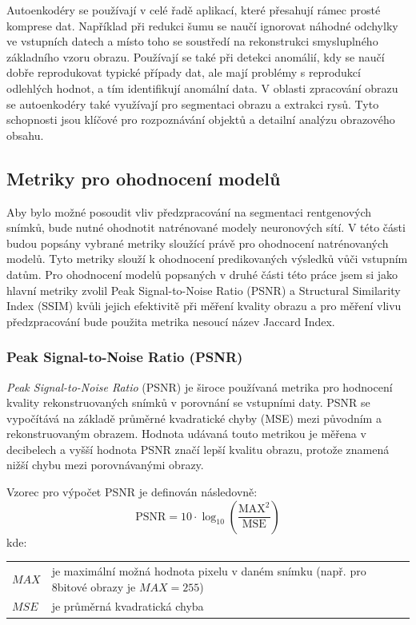 \documentclass[male,czech,api_ing]{thesis}
\makeatletter
\newenvironment{conditions}[1][kde:]
    {#1 \begin{tabular}[t]{>{$}l<{$} @{${}={}$} >{\raggedright\arraybackslash}p{10cm}}}
    {\end{tabular}}
\makeatother
\begin{document}
Autoenkodéry se používají v celé řadě aplikací, které přesahují rámec prosté komprese dat. Například při redukci šumu se naučí ignorovat náhodné odchylky ve vstupních datech a místo toho se soustředí na rekonstrukci smysluplného základního vzoru obrazu. Používají se také při detekci anomálií, kdy se naučí dobře reprodukovat typické případy dat, ale mají problémy s reprodukcí odlehlých hodnot, a tím identifikují anomální data. V oblasti zpracování obrazu se autoenkodéry také využívají pro segmentaci obrazu a extrakci rysů. Tyto schopnosti jsou klíčové pro rozpoznávání objektů a detailní analýzu obrazového obsahu. \cite{Autoencoders, AutoencodersIntroduction}

\subsection{Metriky pro ohodnocení modelů}
Aby bylo možné posoudit vliv předzpracování na segmentaci rentgenových snímků, bude nutné ohodnotit natrénované modely neuronových sítí. V této části budou popsány vybrané metriky sloužící právě pro ohodnocení natrénovaných modelů. Tyto metriky slouží k ohodnocení predikovaných výsledků vůči vstupním datům. Pro ohodnocení modelů popsaných v druhé části této práce jsem si jako hlavní metriky zvolil Peak Signal-to-Noise Ratio (PSNR) a Structural Similarity Index (SSIM) kvůli jejich efektivitě při měření kvality obrazu a pro měření vlivu předzpracování bude použita metrika nesoucí název Jaccard Index.

\subsubsection{Peak Signal-to-Noise Ratio (PSNR)}
\textit{Peak Signal-to-Noise Ratio} (PSNR) je široce používaná metrika pro hodnocení kvality rekonstruovaných snímků v porovnání se vstupními daty. PSNR se vypočítává na základě průměrné kvadratické chyby (MSE) mezi původním a rekonstruovaným obrazem. Hodnota udávaná touto metrikou je měřena v decibelech a vyšší hodnota PSNR značí lepší kvalitu obrazu, protože znamená nižší chybu mezi porovnávanými obrazy. \cite{PSNRSSIM}

Vzorec pro výpočet PSNR je definován následovně:
\begin{equation}
    \text{PSNR} = 10 \cdot \log_{10} \left( \frac{\text{MAX}^2}{\text{MSE}} \right)
\end{equation}
\begin{conditions}
    MAX &  je maximální možná hodnota pixelu v daném snímku (např. pro 8bitové obrazy je $MAX = 255$) \\
    MSE &  je průměrná kvadratická chyba
\end{conditions}
\end{document}
